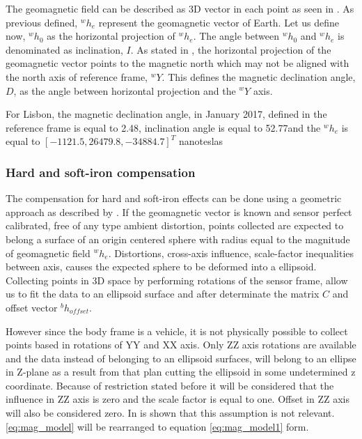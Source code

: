 The geomagnetic field can be described as 3D vector in each point as seen in
\cite{ipma_geomagnetism}. As previous defined, ${}^wh_e$ represent the
geomagnetic vector of Earth. Let us define now, ${}^wh_0$ as the
horizontal projection of ${}^wh_e$. The angle between ${}^wh_0$ and
${}^wh_e$ is denominated as inclination, $I$. As stated in
\cite{ipma_geomagnetism}, the horizontal projection of the geomagnetic vector
points to the magnetic north which may not be aligned with the north axis of
reference frame, ${}^wY$. This defines the magnetic declination angle, $D$, as the
angle between horizontal projection and the ${}^wY$ axis.

For Lisbon, the magnetic declination angle, in January 2017, defined in the reference
frame is equal to 2.48\degree, inclination angle is equal to 52.77\degree and
the ${}^wh_e$ is equal to $[-1121.5, 26479.8, -34884.7]^T$ nanoteslas
\cite{noaa}




\subsubsection{Hard and soft-iron compensation}

The compensation for hard and soft-iron effects can be done using a geometric
approach as described by \cite{magAN4246} \cite{Caruso2000}
\cite{Vasconcelos2011}. If the geomagnetic vector is known and sensor perfect
calibrated, free of any type ambient distortion, points collected are expected
to belong a surface of an origin centered sphere with radius equal to the
magnitude of geomagnetic field ${}^wh_e$. Distortions, cross-axis
influence, scale-factor inequalities between axis, causes the expected sphere to
be deformed into a ellipsoid. Collecting points in 3D space by performing
rotations of the sensor frame, allow us to fit the data to an ellipsoid surface
and after determinate the matrix $C$ and offset vector ${}^bh_{offset}$.

However since the body frame is a vehicle, it is not physically possible to
collect points based in rotations of YY and XX axis. Only ZZ axis rotations are
available and the data instead of belonging to an ellipsoid surfaces, will
belong to an ellipse in Z-plane as a result from that plan cutting the ellipsoid
in some undetermined z coordinate. Because of restriction stated before it will
be considered that the influence in ZZ axis is zero and the scale
factor is equal to one. Offset in ZZ axis will also be considered zero. In \cite{thesis_BT} is shown that this assumption is not relevant. \eqref{eq:mag_model} will be rearranged to equation \eqref{eq:mag_model1}
form.

